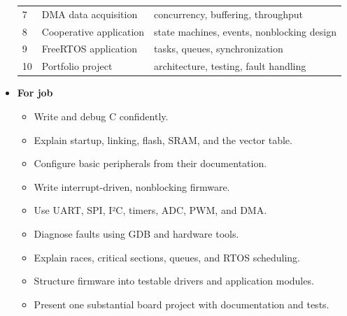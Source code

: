 \documentclass{report}
\begin{document}
\begin{itemize}
\begin{center}
\begin{tabularx}{\textwidth}{@{}lXX@{}}
                    7	&DMA data acquisition	&concurrency, buffering, throughput\\[2ex]
                    8	&Cooperative application&	state machines, events, nonblocking design\\[2ex]
                    9	&FreeRTOS application	&tasks, queues, synchronization\\[2ex]
                    10	&Portfolio project	&architecture, testing, fault handling \\
                    \bottomrule
                \end{tabularx}
            \end{center}
        \item \textbf{For job}
            \begin{itemize}
                \item Write and debug C confidently.
                \item Explain startup, linking, flash, SRAM, and the vector table.
                \item Configure basic peripherals from their documentation.
                \item Write interrupt-driven, nonblocking firmware.
                \item Use UART, SPI, I²C, timers, ADC, PWM, and DMA.
                \item Diagnose faults using GDB and hardware tools.
                \item Explain races, critical sections, queues, and RTOS scheduling.
                \item Structure firmware into testable drivers and application modules.
                \item Present one substantial board project with documentation and tests.
            \end{itemize}
    \end{itemize}

    \pagebreak 
\end{document}
